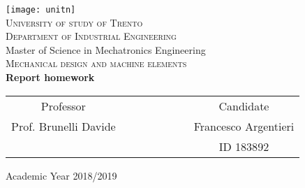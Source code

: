 \begin{titlepage}
 \begin{center}
 \texttt{[image: unitn]}\\
 \vspace{1.5em}
 {\Large \textsc{University of study of Trento}}\\
 \vspace{1.5em}
 {\Large \textsc{Department of Industrial Engineering}}\\
 \vspace{4em}
 {\normalsize Master of Science in Mechatronics Engineering}\\
 \vspace{1.5em}
 {\Large \textsc{Mechanical design and machine elements}}\\
 \vspace{4em}
 {\LARGE\textbf{
 	Report homework
 }}\\
 \end{center}

\vskip 2.0cm
\vskip 2.0cm
 \begin{center}
 \begin{tabular}{c c c c c c c c}
 Professor & & & & & & & Candidate \\[0.2cm]
 \large{Prof. Brunelli Davide} & & & & & & & \large{Francesco Argentieri}\\[0.4cm]
  & & & & & & & ID 183892\\[0.2cm]
 \end{tabular}
 \end{center}

\vskip 1.5cm
\begin{center}
{\normalsize Academic Year 2018/2019}
\end{center}
\end{titlepage}

\clearpage{\pagestyle{empty}\cleardoublepage}
